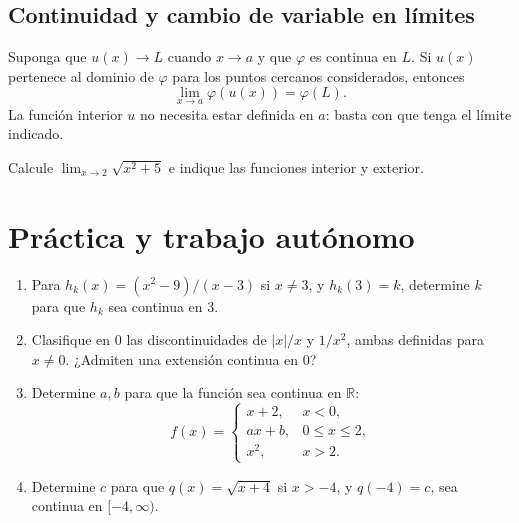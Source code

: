 \documentclass[10pt,a5paper]{article}
\newif\ifmostrarSoluciones
\begin{document}
\subsection*{Continuidad y cambio de variable en límites}

\begin{teorema}
Suponga que $u(x)\to L$ cuando $x\to a$ y que $\varphi$ es continua en $L$. Si $u(x)$ pertenece al dominio de $\varphi$ para los puntos cercanos considerados, entonces
\[
  \lim_{x\to a}\varphi(u(x))=\varphi(L).
\]
La función interior $u$ no necesita estar definida en $a$: basta con que tenga el límite indicado.
\end{teorema}

\begin{ejemplo}
Calcule $\displaystyle\lim_{x\to2}\sqrt{x^2+5}$ e indique las funciones interior y exterior.
\end{ejemplo}
\ifmostrarSoluciones
\begin{solucion}
Con $t=x^2+5$ se tiene $t\to9$ cuando $x\to2$. La función exterior $\varphi(t)=\sqrt{t}$ es continua en $9$, de modo que
\[
  \lim_{x\to2}\sqrt{x^2+5}=\sqrt{9}=3.
\]
El radicando es positivo para todo $x$, así que no hay restricciones adicionales.
\end{solucion}
\else\vspace{16mm}\fi

\section*{Práctica y trabajo autónomo}

\begin{ejercicios}
\begin{enumerate}
  \item Para $h_k(x)=(x^2-9)/(x-3)$ si $x\neq3$, y $h_k(3)=k$, determine $k$ para que $h_k$ sea continua en $3$.
  \item Clasifique en $0$ las discontinuidades de $|x|/x$ y $1/x^2$, ambas definidas para $x\neq0$. ¿Admiten una extensión continua en $0$?
  \item Determine $a,b$ para que la función sea continua en $\mathbb{R}$:
  \[
    f(x)=\begin{cases}
      x+2,&x<0,\\
      ax+b,&0\leq x\leq2,\\
      x^2,&x>2.
    \end{cases}
  \]
  \item Determine $c$ para que $q(x)=\sqrt{x+4}$ si $x>-4$, y $q(-4)=c$, sea continua en $[-4,\infty)$.
\end{enumerate}
\end{ejercicios}
\end{document}
